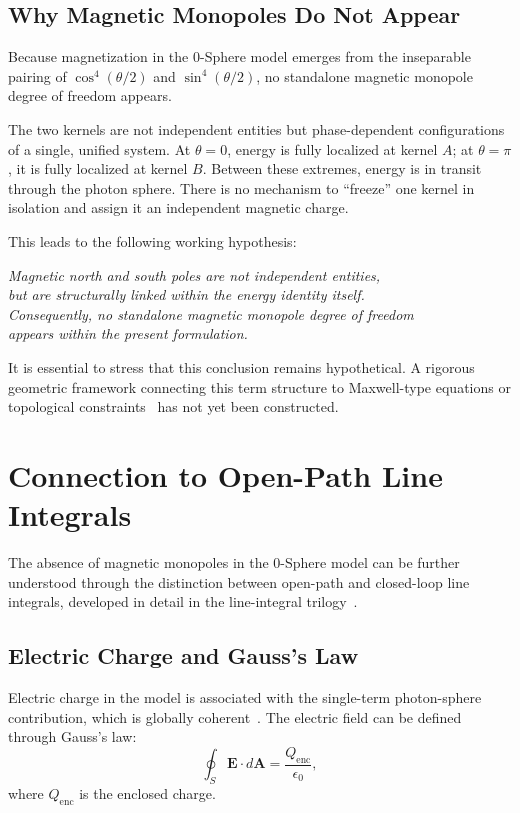 \documentclass[12pt,letterpaper]{article}
\begin{document}
\subsection{Why Magnetic Monopoles Do Not Appear}

Because magnetization in the 0-Sphere model emerges from the inseparable pairing of $\cos^4(\theta/2)$ and $\sin^4(\theta/2)$, no standalone magnetic monopole degree of freedom appears.

The two kernels are not independent entities but phase-dependent configurations of a single, unified system. At $\theta = 0$, energy is fully localized at kernel $A$; at $\theta = \pi$, it is fully localized at kernel $B$. Between these extremes, energy is in transit through the photon sphere. There is no mechanism to ``freeze'' one kernel in isolation and assign it an independent magnetic charge.

This leads to the following working hypothesis:

\begin{center}
\textit{Magnetic north and south poles are not independent entities,\\
but are structurally linked within the energy identity itself.\\
Consequently, no standalone magnetic monopole degree of freedom\\
appears within the present formulation.}
\end{center}

It is essential to stress that this conclusion remains hypothetical. A rigorous geometric framework connecting this term structure to Maxwell-type equations or topological constraints~\cite{Nakahara2003} has not yet been constructed.


\section{Connection to Open-Path Line Integrals}

The absence of magnetic monopoles in the 0-Sphere model can be further understood through the distinction between open-path and closed-loop line integrals, developed in detail in the line-integral trilogy~\cite{hanamura18067760,hanamura18135855,hanamura18203433}.

\subsection{Electric Charge and Gauss's Law}

Electric charge in the model is associated with the single-term photon-sphere contribution, which is globally coherent~\cite{hanamura18603340}. The electric field can be defined through Gauss's law:
\begin{equation}
\oint_S \mathbf{E} \cdot d\mathbf{A} = \frac{Q_{\mathrm{enc}}}{\epsilon_0},
\end{equation}
where $Q_{\mathrm{enc}}$ is the enclosed charge.
\end{document}
